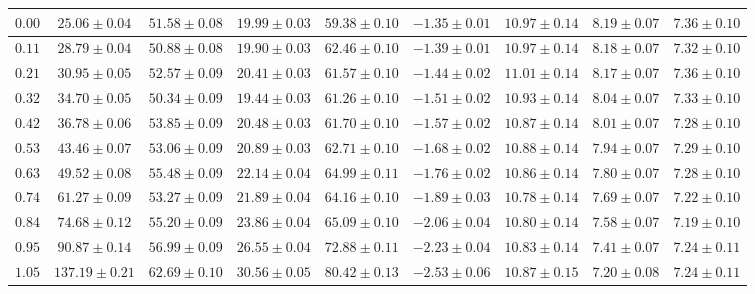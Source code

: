     \begin{sidewaystable}[t!]
        \centering
        \begin{tabular}{|c|c|c|c|c|c|c|c|c|}
            \hline
            $0.00$ & $25.06 \pm 0.04$ & $51.58 \pm 0.08$ & $19.99 \pm 0.03$ & $59.38 \pm 0.10$ & $-1.35 \pm 0.01$ & $10.97 \pm 0.14$ & $8.19 \pm 0.07$ & $7.36 \pm 0.10$ \\
            \hline
            $0.11$ & $28.79 \pm 0.04$ & $50.88 \pm 0.08$ & $19.90 \pm 0.03$ & $62.46 \pm 0.10$ & $-1.39 \pm 0.01$ & $10.97 \pm 0.14$ & $8.18 \pm 0.07$ & $7.32 \pm 0.10$ \\
            \hline
            $0.21$ & $30.95 \pm 0.05$ & $52.57 \pm 0.09$ & $20.41 \pm 0.03$ & $61.57 \pm 0.10$ & $-1.44 \pm 0.02$ & $11.01 \pm 0.14$ & $8.17 \pm 0.07$ & $7.36 \pm 0.10$ \\
            \hline
            $0.32$ & $34.70 \pm 0.05$ & $50.34 \pm 0.09$ & $19.44 \pm 0.03$ & $61.26 \pm 0.10$ & $-1.51 \pm 0.02$ & $10.93 \pm 0.14$ & $8.04 \pm 0.07$ & $7.33 \pm 0.10$ \\
            \hline
            $0.42$ & $36.78 \pm 0.06$ & $53.85 \pm 0.09$ & $20.48 \pm 0.03$ & $61.70 \pm 0.10$ & $-1.57 \pm 0.02$ & $10.87 \pm 0.14$ & $8.01 \pm 0.07$ & $7.28 \pm 0.10$ \\
            \hline
            $0.53$ & $43.46 \pm 0.07$ & $53.06 \pm 0.09$ & $20.89 \pm 0.03$ & $62.71 \pm 0.10$ & $-1.68 \pm 0.02$ & $10.88 \pm 0.14$ & $7.94 \pm 0.07$ & $7.29 \pm 0.10$ \\
            \hline
            $0.63$ & $49.52 \pm 0.08$ & $55.48 \pm 0.09$ & $22.14 \pm 0.04$ & $64.99 \pm 0.11$ & $-1.76 \pm 0.02$ & $10.86 \pm 0.14$ & $7.80 \pm 0.07$ & $7.28 \pm 0.10$ \\
            \hline
            $0.74$ & $61.27 \pm 0.09$ & $53.27 \pm 0.09$ & $21.89 \pm 0.04$ & $64.16 \pm 0.10$ & $-1.89 \pm 0.03$ & $10.78 \pm 0.14$ & $7.69 \pm 0.07$ & $7.22 \pm 0.10$ \\
            \hline
            $0.84$ & $74.68 \pm 0.12$ & $55.20 \pm 0.09$ & $23.86 \pm 0.04$ & $65.09 \pm 0.10$ & $-2.06 \pm 0.04$ & $10.80 \pm 0.14$ & $7.58 \pm 0.07$ & $7.19 \pm 0.10$ \\
            \hline
            $0.95$ & $90.87 \pm 0.14$ & $56.99 \pm 0.09$ & $26.55 \pm 0.04$ & $72.88 \pm 0.11$ & $-2.23 \pm 0.04$ & $10.83 \pm 0.14$ & $7.41 \pm 0.07$ & $7.24 \pm 0.11$ \\
            \hline
            $1.05$ & $137.19 \pm 0.21$ & $62.69 \pm 0.10$ & $30.56 \pm 0.05$ & $80.42 \pm 0.13$ & $-2.53 \pm 0.06$ & $10.87 \pm 0.15$ & $7.20 \pm 0.08$ & $7.24 \pm 0.11$ \\

\end{tabular}
\end{sidewaystable}
